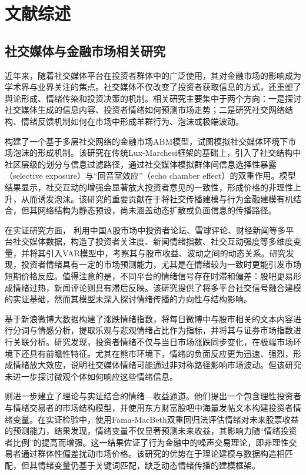 \chapter{文献综述}

\section{社交媒体与金融市场相关研究}

近年来，随着社交媒体平台在投资者群体中的广泛使用，其对金融市场的影响成为学术界与业界关注的焦点。社交媒体不仅改变了投资者获取信息的方式，还重塑了舆论形成、情绪传染和投资决策的机制。相关研究主要集中于两个方向：一是探讨社交媒体生成的信息内容、投资者情绪如何预测市场走势；二是研究社交网络结构、情绪反馈机制如何在市场中形成羊群行为、泡沫或极端波动。

\textcite{bohorquez2024social} 构建了一个基于多层社交网络的金融市场ABM模型，试图模拟社交媒体环境下市场泡沫的形成机制。该研究在传统Lux-Marchesi框架的基础上，引入了社交结构中社区层级的划分与信息过滤路径，通过社交媒体模拟群体间信息选择性暴露（selective exposure）与“回音室效应”（echo chamber effect）的双重作用。模型结果显示，社交互动的增强会显著放大投资者意见的一致性，形成价格的非理性上升，从而诱发泡沫。该研究的重要贡献在于将社交传播建模与行为金融建模有机结合，但其网络结构为静态预设，尚未涵盖动态扩散或负面信息的传播路径。

在实证研究方面，\textcite{shi2020social} 利用中国A股市场中投资者论坛、雪球评论、财经新闻等多平台社交媒体数据，构造了投资者关注度、新闻情绪指数、社交互动强度等多维度变量，并将其引入VAR模型中，考察其与股市收益、波动之间的动态关系。研究发现，投资者情绪具有一定的市场预测能力，尤其是在情绪较为一致时更能引发市场短期价格反应。值得注意的是，不同平台的情绪信号存在时滞和偏差：股吧更易形成情绪过热，新闻评论则具有滞后反映。该研究提供了将多平台社交信号融合建模的实证基础，然而其模型未深入探讨情绪传播的方向性与结构影响。

\textcite{cheng2019emotion} 基于新浪微博大数据构建了涨跌情绪指数，将每日微博中与股市相关的文本内容进行分词与情感分析，提取乐观与悲观情绪占比作为指标，并将其与证券市场指数进行关联分析。研究发现，投资者情绪不仅与当日市场涨跌同步变化，在极端市场环境下还具有前瞻性特征。尤其在熊市环境下，情绪的负面反应更为迅速、强烈，形成情绪放大效应，说明社交媒体情绪可能通过非对称路径影响市场波动。但该研究未进一步探讨微观个体如何响应这些情绪信息。

\textcite{li2018emotion} 则进一步建立了理论与实证结合的情绪—收益通道。他们提出一个包含理性投资者与情绪交易者的市场结构模型，并使用东方财富股吧中海量发帖文本构建投资者情绪变量。在实证检验中，使用Fama-MacBeth双重回归法评估情绪对未来股票收益的预测能力，结果发现，情绪变量不仅显著预测未来收益，其影响力随“情绪投资者比例”的提高而增强。这一结果佐证了行为金融中的噪声交易理论，即非理性交易者通过群体性偏差扰动市场价格。该研究的优势在于理论建模与数据构造相匹配，但其情绪变量仍基于关键词匹配，缺乏动态情绪传播的建模框架。

